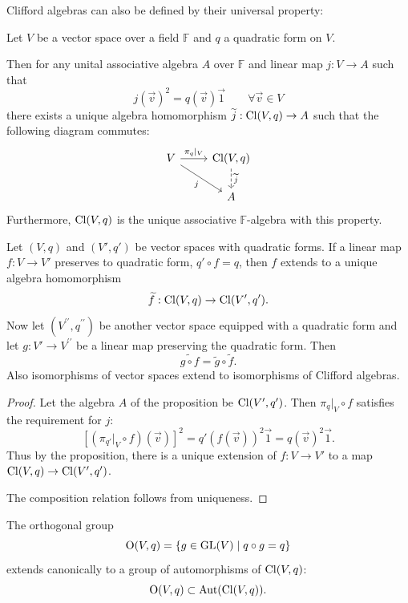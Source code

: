 Clifford algebras can also be defined by their universal property:
\begin{proposition} \label{CliffordUniversalProperty}
Let $V$ be a vector space over a field $\mathbb{F}$ and $q$ a quadratic form on $V$. 

Then for any unital associative algebra $A$ over $\mathbb{F}$ and linear map $j: V \to A$ such that
\[ j(\vec{v})^2 = q(\vec{v}) \vec{1} \qquad \forall \vec{v}\in V \]
there exists a unique algebra homomorphism $\widetilde{j}: \operatorname{Cl}(V,q)\to A$ such that the following diagram commutes:
\[ \begin{tikzcd}
V \rar{\pi_q|_V} \ar[dr, swap, "{j}"] & \Cl(V,q) \dar[dashed]{\widetilde{j}} \\
 & A
\end{tikzcd} \]
Furthermore, $\operatorname{Cl}(V,q)$ is the unique associative $\mathbb{F}$-algebra with this property.
\end{proposition}
\begin{corollary}
Let $(V,q)$ and $(V',q')$ be vector spaces with quadratic forms. If a linear map $f:V\to V'$ preserves to quadratic form, $q'\circ f = q$, then $f$ extends to a unique algebra homomorphism
\[ \widetilde{f}: \operatorname{Cl}(V,q) \to \operatorname{Cl}(V',q'). \]
Now let $(V^{\prime\prime},q^{\prime\prime})$ be another vector space equipped with a quadratic form and let $g: V'\to V^{\prime\prime}$ be a linear map preserving the quadratic form. Then
\[ \widetilde{g\circ f} = \widetilde{g}\circ\widetilde{f}. \]
Also isomorphisms of vector spaces extend to isomorphisms of Clifford algebras.
\end{corollary}
\begin{proof}
Let the algebra $A$ of the proposition be $\operatorname{Cl}(V',q')$. Then $\pi_q|_V\circ f$ satisfies the requirement for $j$:
\[ [(\pi_{q'}|_V\circ f)(\vec{v})]^2 = q'(f(\vec{v}))^2 \vec{1} = q(\vec{v})^2\vec{1}. \]
Thus by the proposition, there is a unique extension of $f:V\to V'$ to a map $\operatorname{Cl}(V,q) \to \operatorname{Cl}(V',q')$.

The composition relation follows from uniqueness.
\end{proof}
\begin{corollary} \label{qOrthogonalMaps}
The orthogonal group
\[ \Ogroup(V,q) = \setbuilder{g\in\GL(V)}{q\circ g = q} \]
extends canonically to a group of automorphisms of $\operatorname{Cl}(V,q)$:
\[ \operatorname{O}(V,q) \subset \operatorname{Aut}(\operatorname{Cl}(V,q)). \]
\end{corollary}

